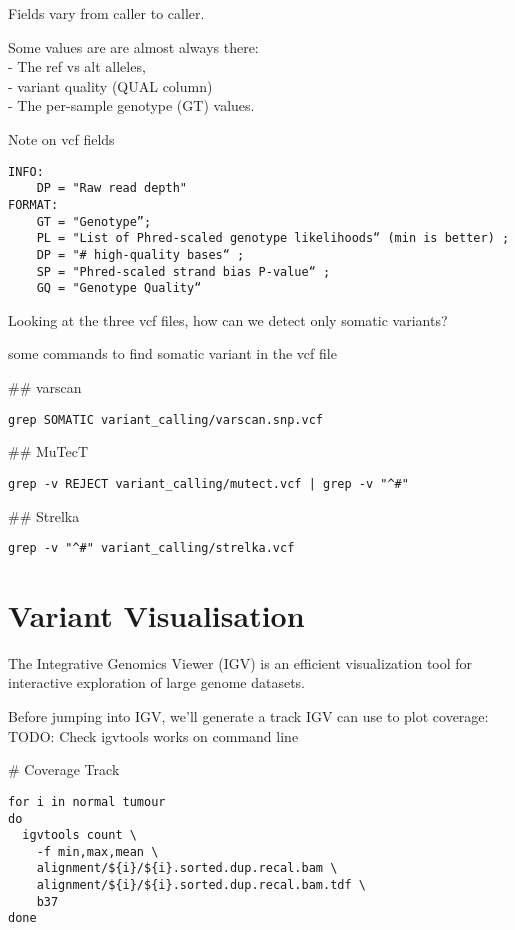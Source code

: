 Fields vary from caller to caller.
 
Some values are are almost always there: \\
   - The ref vs alt alleles, \\
   - variant quality (QUAL column) \\
   - The per-sample genotype (GT) values.

Note on vcf fields
\begin{verbatim}
INFO: 
	DP = "Raw read depth"
FORMAT:
	GT = "Genotype”; 
	PL = "List of Phred-scaled genotype likelihoods“ (min is better) ; 
	DP = "# high-quality bases“ ; 
	SP = "Phred-scaled strand bias P-value“ ; 
	GQ = "Genotype Quality“
\end{verbatim}

\begin{question}
Looking at the three vcf files, how can we detect only somatic variants?
\end{question}
\begin{answer}
some commands to find somatic variant in the vcf file

## varscan
\begin{lstlisting}
grep SOMATIC variant_calling/varscan.snp.vcf 
\end{lstlisting}

## MuTecT
\begin{lstlisting}
grep -v REJECT variant_calling/mutect.vcf | grep -v "^#"
\end{lstlisting}

## Strelka
\begin{lstlisting}
grep -v "^#" variant_calling/strelka.vcf
\end{lstlisting}
\end{answer}


\newpage

\section{Variant Visualisation}

The Integrative Genomics Viewer (IGV) is an efficient visualization tool for interactive exploration of large genome datasets. 

Before jumping into IGV, we'll generate a track IGV can use to plot coverage:
TODO: Check igvtools works on command line

# Coverage Track
\begin{lstlisting}
for i in normal tumour
do
  igvtools count \
    -f min,max,mean \
    alignment/${i}/${i}.sorted.dup.recal.bam \
    alignment/${i}/${i}.sorted.dup.recal.bam.tdf \
    b37
done
\end{lstlisting}


